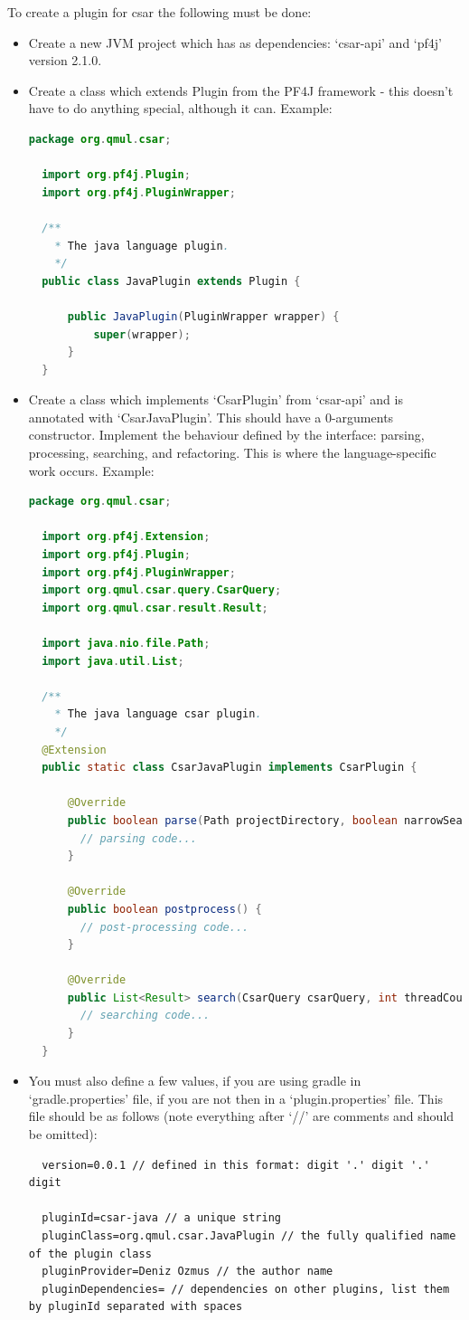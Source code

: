 \documentclass[12pt, letterpaper]{article}
\begin{document}
To create a plugin for csar the following must be done:
\begin{itemize}
  \item Create a new JVM project which has as dependencies: `csar-api' and `pf4j' version 2.1.0.
  \item Create a class which extends Plugin from the PF4J framework - this doesn't have to do anything special, although it can.
  Example:
  \begin{lstlisting}[language=Java]
  package org.qmul.csar;

  import org.pf4j.Plugin;
  import org.pf4j.PluginWrapper;

  /**
    * The java language plugin.
    */
  public class JavaPlugin extends Plugin {

      public JavaPlugin(PluginWrapper wrapper) {
          super(wrapper);
      }
  }
  \end{lstlisting}
  \item Create a class which implements `CsarPlugin' from `csar-api' and is annotated with `CsarJavaPlugin'. This should have a 0-arguments constructor. Implement the behaviour defined by the interface: parsing, processing, searching, and refactoring.
  This is where the language-specific work occurs.
  Example:
  \begin{lstlisting}[language=Java]
  package org.qmul.csar;

  import org.pf4j.Extension;
  import org.pf4j.Plugin;
  import org.pf4j.PluginWrapper;
  import org.qmul.csar.query.CsarQuery;
  import org.qmul.csar.result.Result;

  import java.nio.file.Path;
  import java.util.List;
      
  /**
    * The java language csar plugin.
    */
  @Extension
  public static class CsarJavaPlugin implements CsarPlugin {

      @Override
      public boolean parse(Path projectDirectory, boolean narrowSearch, Path ignoreFile, int threadCount) {
        // parsing code...
      }

      @Override
      public boolean postprocess() {
        // post-processing code...
      }

      @Override
      public List<Result> search(CsarQuery csarQuery, int threadCount) throws Exception {
        // searching code...
      }
  }
  \end{lstlisting}
  \item You must also define a few values, if you are using gradle in `gradle.properties' file, if you are not then in a `plugin.properties' file.
  This file should be as follows (note everything after `//' are comments and should be omitted):
  \begin{lstlisting}
  version=0.0.1 // defined in this format: digit '.' digit '.' digit

  pluginId=csar-java // a unique string
  pluginClass=org.qmul.csar.JavaPlugin // the fully qualified name of the plugin class
  pluginProvider=Deniz Ozmus // the author name
  pluginDependencies= // dependencies on other plugins, list them by pluginId separated with spaces
  \end{lstlisting}
\end{itemize}
\end{document}
